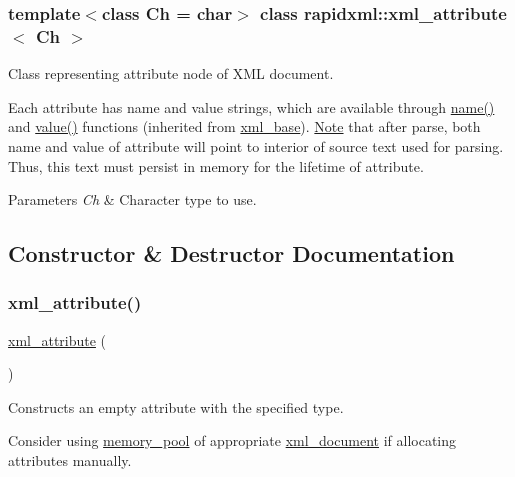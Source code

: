 \subsubsection*{template$<$class Ch = char$>$\newline
class rapidxml\+::xml\+\_\+attribute$<$ Ch $>$}

Class representing attribute node of X\+ML document. 

Each attribute has name and value strings, which are available through \mbox{\hyperlink{classrapidxml_1_1xml__base_af8436e9ee14c127220113eaa956eafee}{name()}} and \mbox{\hyperlink{classrapidxml_1_1xml__base_a558b1045e6751e4024309d41bf35c542}{value()}} functions (inherited from \mbox{\hyperlink{classrapidxml_1_1xml__base}{xml\+\_\+base}}). \mbox{\hyperlink{classNote}{Note}} that after parse, both name and value of attribute will point to interior of source text used for parsing. Thus, this text must persist in memory for the lifetime of attribute. 
\begin{DoxyParams}{Parameters}
{\em Ch} & Character type to use. \\
\hline
\end{DoxyParams}


\subsection{Constructor \& Destructor Documentation}
\mbox{\label{classrapidxml_1_1xml__attribute_ad5464aadf08269a886b730993525db34}} 
\subsubsection{\texorpdfstring{xml\+\_\+attribute()}{xml\_attribute()}}
{\footnotesize\ttfamily \mbox{\hyperlink{classrapidxml_1_1xml__attribute}{xml\+\_\+attribute}} (\begin{DoxyParamCaption}{ }\end{DoxyParamCaption})\hspace{0.3cm}{\ttfamily [inline]}}



Constructs an empty attribute with the specified type. 

Consider using \mbox{\hyperlink{classrapidxml_1_1memory__pool}{memory\+\_\+pool}} of appropriate \mbox{\hyperlink{classrapidxml_1_1xml__document}{xml\+\_\+document}} if allocating attributes manually. 

